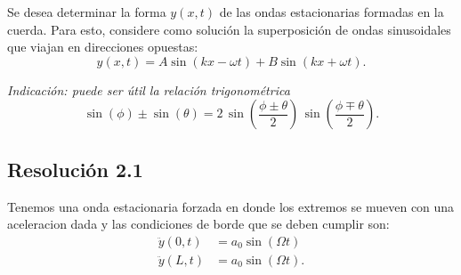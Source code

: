 \documentclass[
  11pt,
  letterpaper,
   addpoints,
   answers
  ]{exam}
\begin{document}
\begin{questions}
Se desea determinar la forma $y(x,t)$ de las ondas estacionarias formadas en la cuerda. Para esto, considere como solución la superposición de ondas sinusoidales que viajan en direcciones opuestas:
\[
  y(x,t) = A\sin(kx-\omega t) + B\sin(kx+\omega t).
\]


  	\textit{Indicación: puede ser útil la relación trigonométrica}
\[
  \sin(\phi) \pm \sin(\theta) = 2\,\sin\!\left(\frac{\phi \pm \theta}{2}\right)\,\sin\!\left(\frac{\phi \mp \theta}{2}\right).
\]
\begin{solution}
  \subsection*{Resolución 2.1}
  Tenemos una onda estacionaria forzada en donde los extremos se mueven con una aceleracion dada y las condiciones de borde que se deben cumplir son:
  \begin{align}
    \ddot y(0,t)&=a_0\sin(\Omega t) \\
    \ddot y(L,t)&=a_0\sin(\Omega t).
  \end{align}


\end{solution}
\end{questions}
\end{document}

